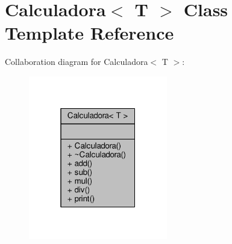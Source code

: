 \hypertarget{class_calculadora}{\section{Calculadora$<$ T $>$ Class Template Reference}
\label{class_calculadora}
}


Collaboration diagram for Calculadora$<$ T $>$\+:
\nopagebreak
\begin{figure}[H]
\begin{center}
\leavevmode
\includegraphics[width=172pt]{class_calculadora__coll__graph}
\end{center}
\end{figure}
